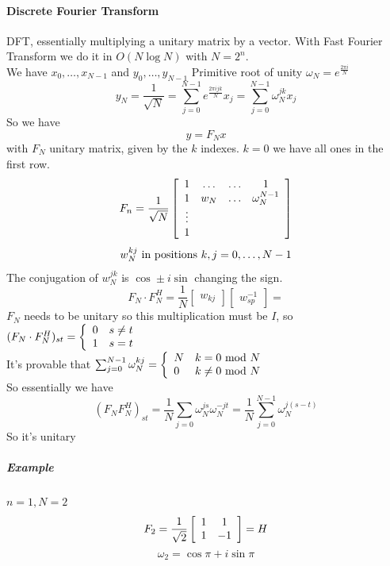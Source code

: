 \documentclass[10pt]{report}
\begin{document}
\paragraph{Discrete Fourier Transform} DFT, essentially multiplying a unitary matrix by a vector. With Fast Fourier Transform we do it in $O(N\log N)$ with $N = 2^n$.\\
We have $x_0,\ldots,x_{N-1}$ and $y_0,\ldots,y_{N-1}$ 
Primitive root of unity $\omega_N = e^{\frac{2\pi i}{N}}$
$$y_N = \frac{1}{\sqrt{N}} = \sum_{j=0}^{N-1} e^{\frac{2\pi ijk}{N}}x_j= \sum_{j=0}^{N-1} \omega_N^{jk}x_j$$
So we have $$y = F_N x$$ with $F_N$ unitary matrix, given by the $k$ indexes. $k=0$ we have all ones in the first row.
$$F_n = \frac{1}{\sqrt{N}}\left[\begin{array}{c c c c}
1 & \ldots & \ldots & 1\\
1 & w_N & \ldots & \omega_N^{N-1}\\
\vdots\\
1
\end{array}\right]$$
$$w_N^{kj}\hbox{ in positions }k,j=0,\ldots,N-1$$
The conjugation of $w_N^{jk}$ is $\cos \pm i\sin$ changing the sign.
$$F_N\cdot F_N^H = \frac{1}{N}\left[\begin{array}{c}
w_{kj}
\end{array}\right]\left[\begin{array}{c}
w_{sp}^{-1}
\end{array}\right] = $$
$F_N$ needs to be unitary so this multiplication must be $I$, so $(F_N\cdot F_N^H)_{st}=\left\{\begin{array}{l l}
0&s\neq t\\
1&s = t
\end{array}\right.$\\
It's provable that $\sum_{j=0}^{N-1}\omega_N^{kj}=\left\{\begin{array}{l l}
N&k= 0\hbox{ mod }N\\
0&k\neq 0\hbox{ mod }N
\end{array}\right.$\\
So essentially we have $$(F_NF_N^H)_{st} = \frac{1}{N}\sum_{j=0}\omega_N^{js}\omega_N^{-jt}= \frac{1}{N}\sum_{j=0}^{N-1}\omega_N^{j(s-t)}$$
So it's unitary %
\subparagraph{Example} $n=1, N=2$ $$F_2=\frac{1}{\sqrt{2}}\left[\begin{array}{c c}
1&1\\1&-1
\end{array}\right] = H$$
$$\omega_2 = \cos\pi + i\sin\pi$$
\end{document}
